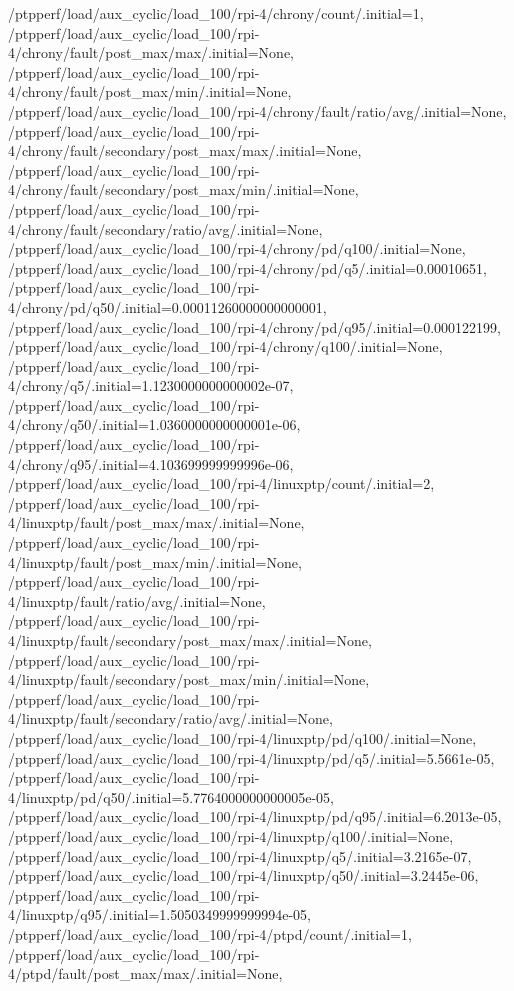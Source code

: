 {    /ptpperf/load/aux_cyclic/load_100/rpi-4/chrony/count/.initial=1,
    /ptpperf/load/aux_cyclic/load_100/rpi-4/chrony/fault/post_max/max/.initial=None,
    /ptpperf/load/aux_cyclic/load_100/rpi-4/chrony/fault/post_max/min/.initial=None,
    /ptpperf/load/aux_cyclic/load_100/rpi-4/chrony/fault/ratio/avg/.initial=None,
    /ptpperf/load/aux_cyclic/load_100/rpi-4/chrony/fault/secondary/post_max/max/.initial=None,
    /ptpperf/load/aux_cyclic/load_100/rpi-4/chrony/fault/secondary/post_max/min/.initial=None,
    /ptpperf/load/aux_cyclic/load_100/rpi-4/chrony/fault/secondary/ratio/avg/.initial=None,
    /ptpperf/load/aux_cyclic/load_100/rpi-4/chrony/pd/q100/.initial=None,
    /ptpperf/load/aux_cyclic/load_100/rpi-4/chrony/pd/q5/.initial=0.00010651,
    /ptpperf/load/aux_cyclic/load_100/rpi-4/chrony/pd/q50/.initial=0.00011260000000000001,
    /ptpperf/load/aux_cyclic/load_100/rpi-4/chrony/pd/q95/.initial=0.000122199,
    /ptpperf/load/aux_cyclic/load_100/rpi-4/chrony/q100/.initial=None,
    /ptpperf/load/aux_cyclic/load_100/rpi-4/chrony/q5/.initial=1.1230000000000002e-07,
    /ptpperf/load/aux_cyclic/load_100/rpi-4/chrony/q50/.initial=1.0360000000000001e-06,
    /ptpperf/load/aux_cyclic/load_100/rpi-4/chrony/q95/.initial=4.103699999999996e-06,
    /ptpperf/load/aux_cyclic/load_100/rpi-4/linuxptp/count/.initial=2,
    /ptpperf/load/aux_cyclic/load_100/rpi-4/linuxptp/fault/post_max/max/.initial=None,
    /ptpperf/load/aux_cyclic/load_100/rpi-4/linuxptp/fault/post_max/min/.initial=None,
    /ptpperf/load/aux_cyclic/load_100/rpi-4/linuxptp/fault/ratio/avg/.initial=None,
    /ptpperf/load/aux_cyclic/load_100/rpi-4/linuxptp/fault/secondary/post_max/max/.initial=None,
    /ptpperf/load/aux_cyclic/load_100/rpi-4/linuxptp/fault/secondary/post_max/min/.initial=None,
    /ptpperf/load/aux_cyclic/load_100/rpi-4/linuxptp/fault/secondary/ratio/avg/.initial=None,
    /ptpperf/load/aux_cyclic/load_100/rpi-4/linuxptp/pd/q100/.initial=None,
    /ptpperf/load/aux_cyclic/load_100/rpi-4/linuxptp/pd/q5/.initial=5.5661e-05,
    /ptpperf/load/aux_cyclic/load_100/rpi-4/linuxptp/pd/q50/.initial=5.7764000000000005e-05,
    /ptpperf/load/aux_cyclic/load_100/rpi-4/linuxptp/pd/q95/.initial=6.2013e-05,
    /ptpperf/load/aux_cyclic/load_100/rpi-4/linuxptp/q100/.initial=None,
    /ptpperf/load/aux_cyclic/load_100/rpi-4/linuxptp/q5/.initial=3.2165e-07,
    /ptpperf/load/aux_cyclic/load_100/rpi-4/linuxptp/q50/.initial=3.2445e-06,
    /ptpperf/load/aux_cyclic/load_100/rpi-4/linuxptp/q95/.initial=1.5050349999999994e-05,
    /ptpperf/load/aux_cyclic/load_100/rpi-4/ptpd/count/.initial=1,
    /ptpperf/load/aux_cyclic/load_100/rpi-4/ptpd/fault/post_max/max/.initial=None,
}
